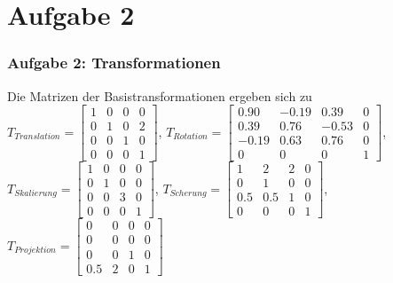\documentclass[accentcolor=tud9c,colorbacktitle,inverttitle,landscape,german,presentation,t]{tudbeamer}
\begin{document}
\section{Aufgabe 2}
\begin{frame}
	\frametitle{Aufgabe 2: Transformationen}
	Die Matrizen der Basistransformationen ergeben sich zu
	$T_{Translation}=\begin{bmatrix}
	1 & 0 & 0 & 0\\
	0 & 1 & 0 & 2\\
	0 & 0 & 1 & 0\\
	0 & 0 & 0 & 1
	\end{bmatrix} $, 
	$T_{Rotation}=\begin{bmatrix}
	0.90 & -0.19 & 0.39 & 0\\
	0.39 & 0.76 & -0.53 & 0\\
	-0.19 & 0.63 & 0.76 & 0\\
	0 & 0 & 0 & 1
	\end{bmatrix} $, 
	$T_{Skalierung}=\begin{bmatrix}
	1 & 0 & 0 & 0\\
	0 & 1 & 0 & 0\\
	0 & 0 & 3 & 0\\
	0 & 0 & 0 & 1
	\end{bmatrix} $, 
	$T_{Scherung}=\begin{bmatrix}
	1 & 2 & 2 & 0\\
	0 & 1 & 0 & 0\\
	0.5 & 0.5 & 1 & 0\\
	0 & 0 & 0 & 1
	\end{bmatrix} $,
	 $T_{Projektion}=\begin{bmatrix}
	 0 & 0 & 0 & 0\\
	 0 & 0 & 0 & 0\\
	 0 & 0 & 1 & 0\\
	 0.5 & 2 & 0 & 1
	 \end{bmatrix} $\\

\end{frame}
\end{document}
